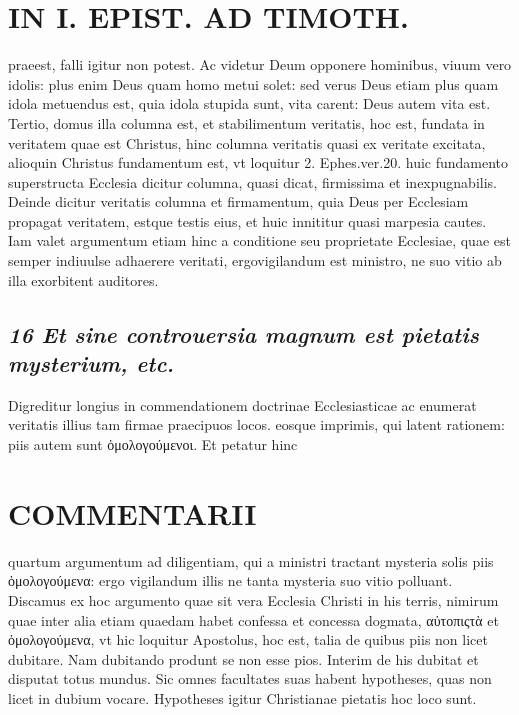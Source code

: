 \documentclass{article}
\begin{document}
\begin{pages}
\section*{IN I. EPIST. AD TIMOTH. }
\marginpar{[ p.79 ]}\pstart praeest, falli igitur non potest. Ac videtur Deum opponere hominibus, viuum vero idolis: plus enim Deus quam homo metui solet: sed verus Deus etiam plus quam idola metuendus est, quia idola stupida sunt, vita carent: Deus autem vita est.  \pend\pstart Tertio, domus illa columna est, et stabilimentum veritatis, hoc est, fundata in veritatem quae est Christus, hinc columna veritatis quasi ex veritate excitata, alioquin Christus fundamentum est, vt loquitur 2. Ephes.ver.20. huic fundamento superstructa Ecclesia dicitur columna, quasi dicat, firmissima et inexpugnabilis. Deinde dicitur veritatis columna et firmamentum, quia Deus per Ecclesiam propagat veritatem, estque testis eius, et huic innititur quasi marpesia cautes. Iam valet argumentum etiam hinc a conditione seu proprietate Ecclesiae, quae est semper indiuulse adhaerere veritati, ergovigilandum est ministro, ne suo vitio ab illa exorbitent auditores.  \pend
{}
{}
\subsection*{\textit{16 Et sine controuersia magnum est pietatis mysterium, etc. }}\pstart Digreditur longius in commendationem doctrinae Ecclesiasticae ac enumerat veritatis illius tam firmae praecipuos locos. eosque imprimis, qui latent rationem: piis autem sunt ὁμολογούμενοι. Et petatur hinc  \pend
\section*{COMMENTARII }
\marginpar{[ p.80 ]}\pstart quartum argumentum ad diligentiam, qui a ministri tractant mysteria solis piis ὁμολογούμενα: ergo vigilandum illis ne tanta mysteria suo vitio polluant. Discamus ex hoc argumento quae sit vera Ecclesia Christi in his terris, nimirum quae inter alia etiam quaedam habet confessa et concessa dogmata, αὐτοπιςτὰ et ὁμολογούμενα, vt hic loquitur Apostolus, hoc est, talia de quibus piis non licet dubitare. Nam dubitando produnt se non esse pios. Interim de his dubitat et disputat totus mundus. Sic omnes facultates suas habent hypotheses, quas non licet in dubium vocare. Hypotheses igitur Christianae pietatis hoc loco sunt.  \pend
{}
{}

\end{pages}
\end{document}
